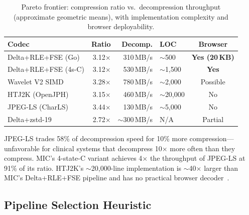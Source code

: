 \documentclass[10pt,twocolumn]{article}
\begin{document}
\begin{table}[h]
  \centering
  \caption{Pareto frontier: compression ratio vs.\ decompression throughput (approximate geometric means), with implementation complexity and browser deployability.}
  \label{tab:pareto}
  \small
  \setlength{\tabcolsep}{3pt}
  \begin{tabular}{lrrlc}
    \toprule
    Codec & Ratio & Decomp. & LOC & Browser \\
    \midrule
    Delta+RLE+FSE (Go)   & 3.12$\times$ & 310\,MB/s & $\sim$500   & \textbf{Yes (20\,KB)} \\
    Delta+RLE+FSE (4s-C) & 3.12$\times$ & 530\,MB/s & $\sim$1,500 & \textbf{Yes} \\
    Wavelet V2 SIMD      & 3.28$\times$ & 780\,MB/s & $\sim$2,000 & Possible \\
    HTJ2K (OpenJPH)      & 3.15$\times$ & 460\,MB/s & $\sim$20,000 & No \\
    JPEG-LS (CharLS)     & 3.44$\times$ & 130\,MB/s & $\sim$5,000 & No \\
    Delta+zstd-19        & 2.72$\times$ & $\sim$300\,MB/s & N/A & Partial \\
    \bottomrule
  \end{tabular}
\end{table}

JPEG-LS trades 58\% of decompression speed for 10\% more compression---unfavorable for clinical systems that decompress 10$\times$ more often than they compress. MIC's 4-state-C variant achieves 4$\times$ the throughput of JPEG-LS at 91\% of its ratio. HTJ2K's $\sim$20,000-line implementation is $\sim$40$\times$ larger than MIC's Delta+RLE+FSE pipeline and has no practical browser decoder~\cite{nohtj2kwasm}.

\subsection{Pipeline Selection Heuristic}
\end{document}
